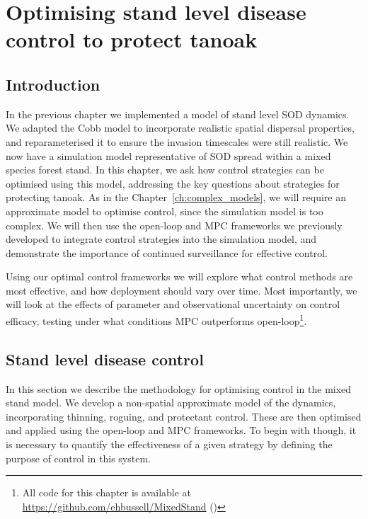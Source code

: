 %
\chapter{Optimising stand level disease control to protect tanoak\label{ch:protect_tanoak_control}}

\section{Introduction\label{sec:ch6:intro}}

In the previous chapter we implemented a model of stand level SOD dynamics. We adapted the Cobb model \citep{cobb_ecosystem_2012} to incorporate realistic spatial dispersal properties, and reparameterised it to ensure the invasion timescales were still realistic. We now have a simulation model representative of SOD spread within a mixed species forest stand. In this chapter, we ask how control strategies can be optimised using this model, addressing the key questions about strategies for protecting tanoak. As in the Chapter~\ref{ch:complex_models}, we will require an approximate model to optimise control, since the simulation model is too complex. We will then use the open-loop and MPC frameworks we previously developed to integrate control strategies into the simulation model, and demonstrate the importance of continued surveillance for effective control.

Using our optimal control frameworks we will explore what control methods are most effective, and how deployment should vary over time. Most importantly, we will look at the effects of parameter and observational uncertainty on control efficacy, testing under what conditions MPC outperforms open-loop\footnote{All code for this chapter is available at \url{https://github.com/ehbussell/MixedStand} ()}.

\section{Stand level disease control\label{sec:ch6:control}}

In this section we describe the methodology for optimising control in the mixed stand model. We develop a non-spatial approximate model of the dynamics, incorporating thinning, roguing, and protectant control. These are then optimised and applied using the open-loop and MPC frameworks. To begin with though, it is necessary to quantify the effectiveness of a given strategy by defining the purpose of control in this system.


